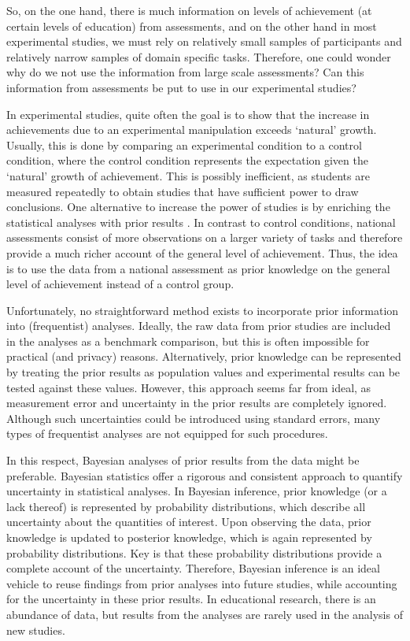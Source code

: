 \documentclass[man, floatsintext]{apa7}
\begin{document}
So, on the one hand, there is much information on levels of achievement (at certain levels of education) from assessments, and on the other hand in most experimental studies, we must rely on relatively small samples of participants and relatively narrow samples of domain specific tasks. Therefore, one could wonder why do we not use the information from large scale assessments? Can this information from assessments be put to use in our experimental studies?

In experimental studies, quite often the goal is to show that the increase in achievements due to an experimental manipulation exceeds `natural' growth.
Usually, this is done by comparing an experimental condition to a control condition, where the control condition represents the expectation given the `natural' growth of achievement.
This is possibly inefficient, as students are measured repeatedly to obtain studies that have sufficient power to draw conclusions.
One alternative to increase the power of studies is by enriching the statistical analyses with prior results \parencite{rijlaarsdam2011application}.
In contrast to control conditions, national assessments consist of more observations on a larger variety of tasks and therefore provide a much richer account of the general level of achievement.
Thus, the idea is to use the data from a national assessment as prior knowledge on the general level of achievement instead of a control group.

Unfortunately, no straightforward method exists to incorporate prior information into (frequentist) analyses. 
Ideally, the raw data from prior studies are included in the analyses as a benchmark comparison, but this is often impossible for practical (and privacy) reasons.
Alternatively, prior knowledge can be represented by treating the prior results as population values and experimental results can be tested against these values.
However, this approach seems far from ideal, as measurement error and uncertainty in the prior results are completely ignored.
Although such uncertainties could be introduced using standard errors, many types of frequentist analyses are not equipped for such procedures.

In this respect, Bayesian analyses of prior results from the data might be preferable. Bayesian statistics offer a rigorous and consistent approach to quantify uncertainty in statistical analyses. In Bayesian inference, prior knowledge (or a lack thereof) is represented by probability distributions, which describe all uncertainty about the quantities of interest. Upon observing the data, prior knowledge is updated to posterior knowledge, which is again represented by probability distributions. Key is that these probability distributions provide a complete account of the uncertainty. Therefore, Bayesian inference is an ideal vehicle to reuse findings from prior analyses into future studies, while accounting for the uncertainty in these prior results. In educational research, there is an abundance of data, but results from the analyses are rarely used in the analysis of new studies.
\end{document}
